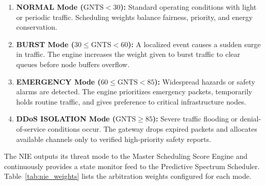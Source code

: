 \documentclass[preprint,review,12pt]{elsarticle}
\begin{document}
\begin{enumerate}

    \item \textbf{NORMAL Mode ($\text{GNTS} < 30$):} Standard operating conditions with light or periodic traffic. Scheduling weights balance fairness, priority, and energy conservation.

    \item \textbf{BURST Mode ($30 \le \text{GNTS} < 60$):} A localized event causes a sudden surge in traffic. The engine increases the weight given to burst traffic to clear queues before node buffers overflow.

    \item \textbf{EMERGENCY Mode ($60 \le \text{GNTS} < 85$):} Widespread hazards or safety alarms are detected. The engine prioritizes emergency packets, temporarily holds routine traffic, and gives preference to critical infrastructure nodes.

    \item \textbf{DDoS ISOLATION Mode ($\text{GNTS} \ge 85$):} Severe traffic flooding or denial-of-service conditions occur. The gateway drops expired packets and allocates available channels only to verified high-priority safety reports.

\end{enumerate}

The NIE outputs its threat mode to the Master Scheduling Score Engine and continuously provides a state monitor feed to the Predictive Spectrum Scheduler. Table~\ref{tab:nie_weights} lists the arbitration weights configured for each mode.

\begin{table}[H]
\centering
\caption{Arbitration weights configured by the Network Intelligence Engine across operating regimes.}
\label{tab:nie_weights}
\end{table}
\end{document}
